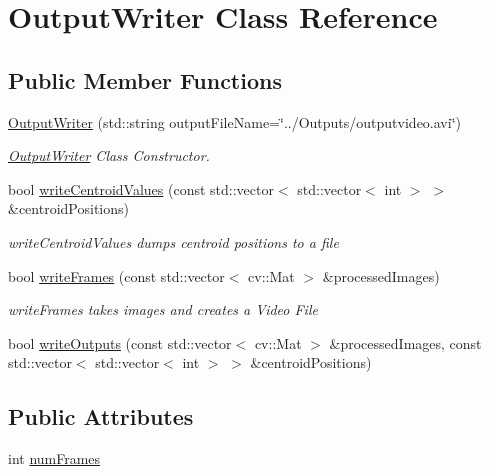 \hypertarget{class_output_writer}{}\section{Output\+Writer Class Reference}
\label{class_output_writer}
\subsection*{Public Member Functions}
\begin{DoxyCompactItemize}
\item 
\hyperlink{class_output_writer_a607817b27493dee2a2e91f583de76fc5}{Output\+Writer} (std\+::string output\+File\+Name=\char`\"{}../Outputs/outputvideo.\+avi\char`\"{})
\begin{DoxyCompactList}\small\item\em \hyperlink{class_output_writer}{Output\+Writer} Class Constructor. \end{DoxyCompactList}\item 
bool \hyperlink{class_output_writer_a6312f9a1a2cc0168b8d10ffa3f545d6a}{write\+Centroid\+Values} (const std\+::vector$<$ std\+::vector$<$ int $>$ $>$ \&centroid\+Positions)
\begin{DoxyCompactList}\small\item\em write\+Centroid\+Values dumps centroid positions to a file \end{DoxyCompactList}\item 
bool \hyperlink{class_output_writer_ae515fcd72bfbc176e64ddb7c56b1823a}{write\+Frames} (const std\+::vector$<$ cv\+::\+Mat $>$ \&processed\+Images)
\begin{DoxyCompactList}\small\item\em write\+Frames takes images and creates a Video File \end{DoxyCompactList}\item 
bool \hyperlink{class_output_writer_a71d6d480712ca5a2dc777acccffddc02}{write\+Outputs} (const std\+::vector$<$ cv\+::\+Mat $>$ \&processed\+Images, const std\+::vector$<$ std\+::vector$<$ int $>$ $>$ \&centroid\+Positions)
\end{DoxyCompactItemize}
\subsection*{Public Attributes}
\begin{DoxyCompactItemize}
\item 
int \hyperlink{class_output_writer_a2e2c9edadbe0888c1ab7ae585c9ce54a}{num\+Frames}
\end{DoxyCompactItemize}



